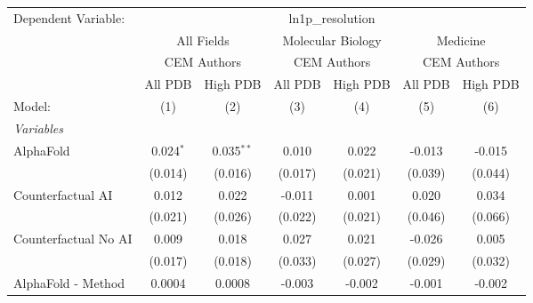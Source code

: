 \begingroup
\centering
\begin{tabular}{lcccccc}
   \tabularnewline \midrule \midrule
   Dependent Variable: & \multicolumn{6}{c}{ln1p\_resolution}\\
 & \multicolumn{2}{c}{All Fields} & \multicolumn{2}{c}{Molecular Biology} & \multicolumn{2}{c}{Medicine} \\
\cmidrule(lr){2-3} \cmidrule(lr){4-5} \cmidrule(lr){6-7}
 & \multicolumn{2}{c}{CEM Authors} & \multicolumn{2}{c}{CEM Authors} & \multicolumn{2}{c}{CEM Authors} \\
\cmidrule(lr){2-3} \cmidrule(lr){4-5} \cmidrule(lr){6-7}
 & \multicolumn{1}{c}{All PDB} & \multicolumn{1}{c}{High PDB} & \multicolumn{1}{c}{All PDB} & \multicolumn{1}{c}{High PDB} & \multicolumn{1}{c}{All PDB} & \multicolumn{1}{c}{High PDB} \\
\cmidrule(lr){2-2} \cmidrule(lr){3-3} \cmidrule(lr){4-4} \cmidrule(lr){5-5} \cmidrule(lr){6-6} \cmidrule(lr){7-7}
   Model:                                                     & (1)            & (2)           & (3)           & (4)           & (5)         & (6)\\  
   \midrule
   \emph{Variables}\\
   AlphaFold                                                  & 0.024$^{*}$    & 0.035$^{**}$  & 0.010         & 0.022         & -0.013      & -0.015\\   
                                                              & (0.014)        & (0.016)       & (0.017)       & (0.021)       & (0.039)     & (0.044)\\   
   Counterfactual AI                                          & 0.012          & 0.022         & -0.011        & 0.001         & 0.020       & 0.034\\   
                                                              & (0.021)        & (0.026)       & (0.022)       & (0.021)       & (0.046)     & (0.066)\\   
   Counterfactual No AI                                       & 0.009          & 0.018         & 0.027         & 0.021         & -0.026      & 0.005\\   
                                                              & (0.017)        & (0.018)       & (0.033)       & (0.027)       & (0.029)     & (0.032)\\   
   AlphaFold - Method                                         & 0.0004         & 0.0008        & -0.003        & -0.002        & -0.001      & -0.002\\   

\end{tabular}
